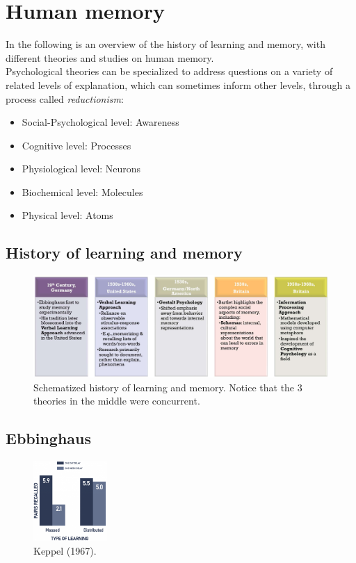 \section{Human memory}
In the following is an overview of the history of learning and 
memory, with different theories and studies on human memory.\\

Psychological theories can be specialized to address questions on a variety of related levels of explanation, which can sometimes inform other levels, through a process called \textit{reductionism}:
\begin{itemize}
    \item Social-Psychological level: Awareness
    \item Cognitive level: Processes
    \item Physiological level: Neurons
    \item Biochemical level: Molecules
    \item Physical level: Atoms
\end{itemize}

\subsection{History of learning and memory}
\begin{figure}[!ht]
    \centering
    \captionsetup{width=.8\linewidth}
    \includegraphics[width=0.9\linewidth]{images/memory.png}
    \caption*{Schematized history of learning and memory. Notice that the 3 theories in the middle were concurrent.}
    \label{fig:memory}
\end{figure}

\subsection{Ebbinghaus}

\begin{figure}
  \centering
  \includegraphics[width=0.25\textwidth]{images/keppel.png}
  \caption{Keppel (1967).}
  \label{fig:keppel}
\end{figure}

